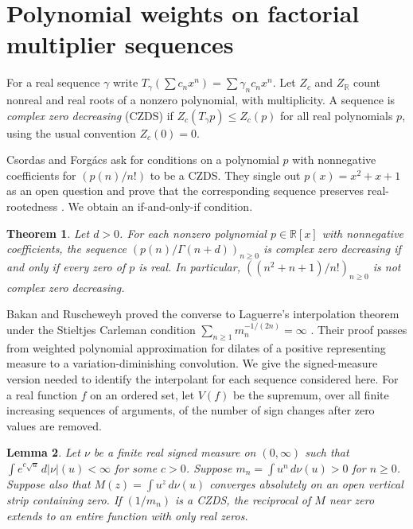 \documentclass[11pt,a4paper]{article}
\newtheorem{theorem}{Theorem}[section]
\newtheorem{lemma}[theorem]{Lemma}
\begin{document}
\section{Polynomial weights on factorial multiplier sequences}
\label{sec:czds}

For a real sequence $\gamma$ write $T_\gamma(\sum c_n x^n)=\sum
\gamma_n c_n x^n$. Let $Z_c$ and $Z_{\mathbb R}$ count nonreal and
real roots of a nonzero polynomial, with multiplicity. A sequence is
\emph{complex zero decreasing} (CZDS) if
$Z_c(T_\gamma p)\le Z_c(p)$ for all real polynomials $p$, using the
usual convention $Z_c(0)=0$.

Csordas and Forg\'acs ask for conditions on a polynomial $p$ with
nonnegative coefficients for $(p(n)/n!)$ to be a CZDS. They single out
$p(x)=x^2+x+1$ as an open question and prove that the corresponding
sequence preserves real-rootedness \cite[Example 34 and Problems 36(b),
37 in arXiv v2]{CFbessel}. We obtain an if-and-only-if condition.

\begin{theorem}\label{thm:czdsfamily}
Let $d>0$. For each nonzero polynomial $p\in\mathbb R[x]$ with
nonnegative coefficients, the sequence $(p(n)/\Gamma(n+d))_{n\ge0}$
is complex zero decreasing if and only if every zero of $p$ is real.
In particular, $( (n^2+n+1)/n!)_{n\ge0}$ is not complex zero decreasing.
\end{theorem}

Bakan and Ruscheweyh proved the converse to Laguerre's interpolation
theorem under the Stieltjes Carleman condition
$\sum_{n\ge1}m_n^{-1/(2n)}=\infty$
\cite[Theorem 1, Corollary 1(B), and Sections 2--4]{BRczds}.
Their proof passes from weighted polynomial approximation for dilates
of a positive representing measure to a variation-diminishing
convolution. We give the signed-measure version needed to identify the
interpolant for each sequence considered here. For a real function $f$ on an ordered set, let
$V(f)$ be the supremum, over all finite increasing sequences of
arguments, of the number of sign changes after zero values are removed.

\begin{lemma}\label{lem:czdsmellin}
Let $\nu$ be a finite real signed measure on $(0,\infty)$ such that
$\int e^{c\sqrt{u}}\,d|\nu|(u)<\infty$ for some $c>0$. Suppose
$m_n=\int u^n\,d\nu(u)>0$ for $n\ge0$. Suppose also that
$M(z)=\int u^z\,d\nu(u)$ converges absolutely on an open vertical
strip containing zero. If $(1/m_n)$ is a CZDS, the reciprocal of
$M$ near zero extends to an entire function with only real zeros.
\end{lemma}
\end{document}
